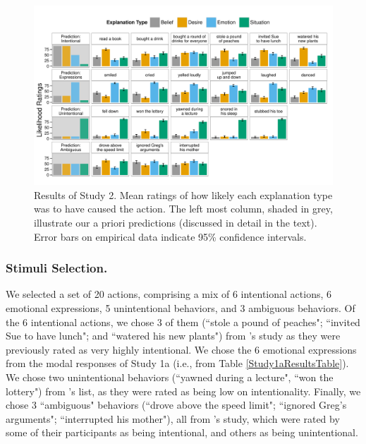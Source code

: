 \documentclass[10pt,letterpaper]{article}
\begin{document}
\begin{figure}[htb!]
\begin{center}
\includegraphics[width=1\linewidth]{images/study2Results.pdf}\end{center}
\caption{ Results of Study 2. Mean ratings of how likely each explanation type was to have caused the action. The left most column, shaded in grey, illustrate our a priori predictions (discussed in detail in the text). Error bars on empirical data indicate 95\% confidence intervals. }
\label{Study2ResultsFig}
\end{figure}


\subsubsection{Stimuli Selection.} We selected a set of 20 actions, comprising a mix of 6 intentional actions, 6 emotional expressions, 5 unintentional behaviors, and 3 ambiguous behaviors. Of the 6 intentional actions, we chose 3 of them (``stole a pound of peaches"; ``invited Sue to have lunch"; and ``watered his new plants") from 's study as they were previously rated as very highly intentional. We chose the 6 emotional expressions from the modal responses of Study 1a (i.e., from Table \ref{Study1aResultsTable}). We chose two unintentional behaviors (``yawned during a lecture", ``won the lottery") from 's list, as they were rated as being low on intentionality. Finally, we chose 3 ``ambiguous" behaviors (``drove above the speed limit"; ``ignored Greg's arguments"; ``interrupted his mother"), all from 's study, which were rated by some of their participants as being intentional, and others as being unintentional.
\end{document}
